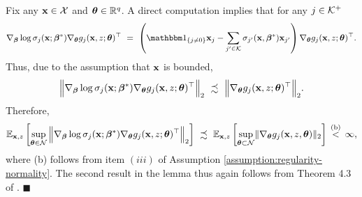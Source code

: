 Fix any $\mathbf{x} \in \mathcal{X}$ and $\bm{\theta} \in \mathbb{R}^q$. 
A direct computation implies that for any $j \in \mathcal{K}^+$
$$
\nabla_{\betavec}\log \sigma_j(\x; {\betavec}^*) \nabla_{\thetavec}g_j(\x, z; {\thetavec})^{\top} ~=~
\left(\ind_{\{j\neq 0\}}\x_j - \sum_{j' \in \Kscr}\sigma_{j'}(\x, \betavec^*)\x_{j'}\right)\nabla_{\thetavec}g_j(\x, z; {\thetavec})^{\top}. 
$$
Thus, due to the assumption that $\mathbf{x}$ is bounded, 
$$
\Big\lVert \nabla_{\bm{\beta}}\log \sigma_j(\mathbf{x}; {\bm{\beta}}^*) \nabla_{\bm{\theta}}g_j(\mathbf{x}, z; {\bm{\theta}})^{\top} \Big\rVert_2 ~\precsim~  \Big\lVert\nabla_{\bm{\theta}}g_j(\mathbf{x}, z; {\bm{\theta}})^{\top} \Big\rVert_2.
$$
Therefore, 
\begin{align*}
    \mathbb{E}_{\mathbf{x},z} \left[\sup_{\bm{\theta} \in \mathcal{N}}
\Big\lVert \nabla_{\bm{\beta}}\log \sigma_j(\mathbf{x}; {\bm{\beta}}^*) \nabla_{\bm{\theta}}g_j(\mathbf{x}, z; {\bm{\theta}})^{\top} \Big\rVert_2 \right]~\precsim~  
\mathbb{E}_{\mathbf{x},z}\left[\sup_{\bm{\theta} \subset \mathcal{N}}\lVert \nabla_{\bm{\theta}} g_j(\mathbf{x}, z, \bm{\theta}) \rVert_2\right] \,\stackrel{\text{(b)}}{<}\, \infty,
\end{align*}
where (b) follows from item $(iii)$ of Assumption \ref{assumption:regularity-normality}.
The second result in the lemma thus again follows from Theorem 4.3 of \cite{newey1994large}.
\hfill $\blacksquare$
\vspace{3mm}


